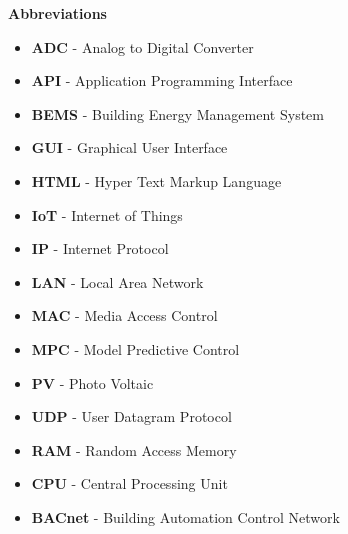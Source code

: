 
\renewcommand{\nomname}{Nomenclature}
\renewcommand{\nomAname}{\textbf{\large Abbreviations}}
\renewcommand{\nomGname}{\textbf{\large Mathematical Symbols}}
\renewcommand{\nomXname}{\textbf{\large Superscripts}}
\renewcommand{\nomZname}{\textbf{\large Subscripts}}

\printnomenclature
\cleardoublepage
{} %


\nomAname
\bigbreak
\begin{itemize}
    \item[]\textbf{ADC} - Analog to Digital Converter
    \item[]\textbf{API} - Application Programming Interface
    \item[]\textbf{BEMS} - Building Energy Management System
    \item[]\textbf{GUI} - Graphical User Interface
    \item[]\textbf{HTML} - Hyper Text Markup Language
    \item[]\textbf{IoT} - Internet of Things
    \item[]\textbf{IP} - Internet Protocol
    \item[]\textbf{LAN} - Local Area Network
    \item[]\textbf{MAC} - Media Access Control 
    \item[]\textbf{MPC} - Model Predictive Control
    \item[]\textbf{PV} - Photo Voltaic
    \item[]\textbf{UDP} - User Datagram Protocol
    \item[]\textbf{RAM} - Random Access Memory
    \item[]\textbf{CPU} - Central Processing Unit
    \item[]\textbf{BACnet} - Building Automation Control Network
\end{itemize}



